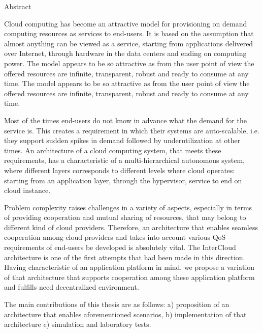 \vspace*{0.5cm}

\begin{center}
  \LARGE Abstract
\end{center}

Cloud computing has become an attractive model for provisioning on demand computing resources as services to end-users. It is based on the assumption that almost anything can be viewed as a service, starting from applications delivered over Internet, through hardware in the data centers and ending on computing power. The model appears to be so attractive as from the user point of view the offered resources are infinite, transparent, robust and ready to consume at any time. The model appears to be so attractive as from the user point of view the offered resources are infinite, transparent, robust and ready to consume at any time.

Most of the times end-users do not know in advance what the demand for the service is. This creates a requirement in which their systems are auto-scalable, i.e. they support sudden spikes in demand followed by underutilization at other times. An architecture of a cloud computing system, that meets these requirements, has a characteristic of a multi-hierarchical autonomous system, where different layers corresponds to different levels where cloud operates: starting from an application layer, through the hypervisor, service to end on cloud instance.

Problem complexity raises challenges in a variety of aspects, especially in terms of providing cooperation and mutual sharing of resources, that may belong to different kind of cloud providers. Therefore, an architecture that enables seamless cooperation among cloud providers and takes into account various QoS requirements of end-users be developed is absolutely vital. The InterCloud architecture is one of the first attempts that had been made in this direction. Having characteristic of an application platform in mind, we propose a variation of that architecture that supports cooperation among these application platform and fulfills need decentralized environment.

The main contributions of this thesis are as follows: a) proposition of an architecture that enables aforementioned scenarios, b) implementation of that architecture c) simulation and laboratory tests.


